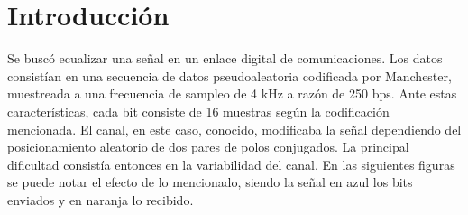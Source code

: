 \documentclass[main.tex]{subfiles}
\begin{document}
\begin{abstract}
\end{abstract}


\section{Introducción}
Se buscó ecualizar una señal en un enlace digital de comunicaciones. 
Los datos consistían en una secuencia de datos pseudoaleatoria 
codificada por Manchester, muestreada a una frecuencia de sampleo
 de 4 kHz a razón de 250 bps. Ante estas características, cada bit consiste de 
 16 muestras según la codificación mencionada. El canal, en este caso, conocido, 
 modificaba la señal dependiendo del posicionamiento
 aleatorio de dos pares de polos conjugados.
La principal dificultad consistía entonces en la variabilidad del canal. En las 
siguientes figuras se puede notar el efecto de lo mencionado, siendo la 
señal en azul los bits enviados y en naranja lo recibido. \newline
\end{document}
